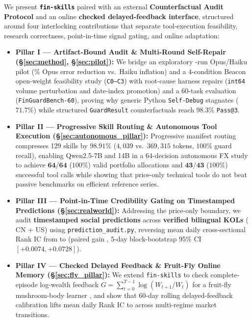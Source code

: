 We present \textbf{\texttt{fin-skills}} paired with an external \textbf{Counterfactual Audit Protocol} and an online \textbf{checked delayed-feedback interface}, structured around four interlocking contributions that separate tool-execution feasibility, research correctness, point-in-time signal gating, and online adaptation:
\begin{itemize}
    \item \textbf{Pillar I --- Artifact-Bound Audit \& Multi-Round Self-Repair (\S\ref{sec:method}, \S\ref{sec:pilot}):} We bridge an exploratory \PilotRuns{}-run Opus/Haiku pilot (\OpusReduction{}\% Opus error reduction vs.\ Haiku inflation) and a 4-condition Beacon open-weight feasibility study (\texttt{C0--C3}) with root-cause harness repairs (\texttt{int64} volume perturbation and date-index promotion) and a 60-task evaluation (\texttt{FinGuardBench-60}), proving why generic Python \texttt{Self-Debug} stagnates ($71.7\%$) while structured \texttt{GuardResult} counterfactuals reach $\mathbf{98.3\%}$ \texttt{Pass@3}.
    \item \textbf{Pillar II --- Progressive Skill Routing \& Autonomous Tool Execution (\S\ref{sec:autonomous_pillar}):} Progressive manifest routing compresses 129 skills by $\mathbf{98.91\%}$ ($4{,}039$ vs.\ $369{,}315$ tokens, $100\%$ guard recall), enabling Qwen2.5-7B and 14B in a 64-decision autonomous FX study to achieve $\mathbf{64/64}$ ($100\%$) valid portfolio allocations and $\mathbf{43/43}$ ($100\%$) successful tool calls while showing that price-only technical tools do not beat passive benchmarks on efficient reference series.
    \item \textbf{Pillar III --- Point-in-Time Credibility Gating on Timestamped Predictions (\S\ref{sec:realworld}):} Addressing the price-only boundary, we audit \textbf{\KOLPredRows{} timestamped social predictions} across \textbf{\KOLTotalAccounts{} verified bilingual KOLs} (\KOLCNCount{} CN + \KOLUSCount{} US) using \texttt{prediction\_audit.py}, reversing mean daily cross-sectional Rank IC from \textbf{\KOLNaiveDailyIC{}} to \textbf{\KOLGatedDailyIC{}} (paired gain \textbf{\KOLPairedDiffIC{}}, 5-day block-bootstrap 95\% CI $[+0.0074, +0.0728]$).
    \item \textbf{Pillar IV --- Checked Delayed Feedback \& Fruit-Fly Online Memory (\S\ref{sec:fly_pillar}):} We extend \texttt{fin-skills} to check complete-episode log-wealth feedback $G = \sum_{t=0}^{T-1}\log(W_{t+1}/W_t)$ for a fruit-fly mushroom-body learner \citep{huang2024memory}, and show that 60-day rolling delayed-feedback calibration lifts mean daily Rank IC to \textbf{\KOLRollingDailyIC{}} across multi-regime market transitions.
\end{itemize}

